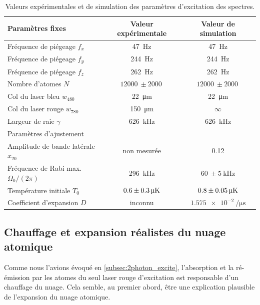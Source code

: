 \begin{table}[h]
	\centering
	\caption[Paramètres de simulation]{Valeurs expérimentales et de simulation des paramètres d'excitation des spectres.
	}
	\label{tab:fit_sim_bigsigma}
	\begin{tabular}{l c c}
		\toprule\midrule
		Paramètres fixes &	Valeur expérimentale & Valeur de simulation\\		
		\midrule
		Fréquence de piégeage $f_x$ & \SI{47}{\Hz} & \SI{47}{\Hz} \\
		Fréquence de piégeage $f_y$ & \SI{244}{\Hz} & \SI{244}{\Hz} \\
		Fréquence de piégeage $f_z$ & \SI{262}{\Hz} & \SI{262}{\Hz} \\
		Nombre d'atomes $N$ & $\SI{12000}{}\pm\SI{2000}{}$ & $\SI{12000}{}\pm\SI{2000}{}$ \\
		Col du laser bleu $w_{480}$ & \SI{22}{\um} & \SI{22}{\um} \\
		Col du laser rouge $w_{780}$ & \SI{150}{\um} & $\infty$ \\
		Largeur de raie $\gamma$ & \SI{626}{\kHz} & \SI{626}{\kHz}\\
		\midrule
		Paramètres d'ajustement & &\\\midrule
		Amplitude de bande latérale $x_{20}$ & non mesurée & \SI{0.12}{} \\
		Fréquence de Rabi max. $\Omega_0/(2\pi)$ & \SI{296}{\kHz} & $\SI{60}{} \pm \SI{5}{\kHz}$\\
		Température initiale $T_0$ & $\SI{0.6}{}\pm\SI{0.3}{\si{\micro\kelvin}}$ & $\SI{0.8}{}\pm\SI{0.05}{\si{\micro\kelvin}}$\\
		Coefficient d'expansion $D$ & inconnu & $\SI{1.575e-2}{\per\us}$\\
		\midrule
		\bottomrule
 	\end{tabular}
\end{table}

\clearpage
\subsection{Chauffage et expansion réalistes du nuage atomique}
\noindent Comme nous l'avions évoqué en \ref{subsec:2photon_excite}, l'absorption et la ré-émission par les atomes du seul laser rouge d'excitation est responsable d'un chauffage du nuage.
Cela semble, au premier abord, être une explication plausible de l'expansion du nuage atomique.

